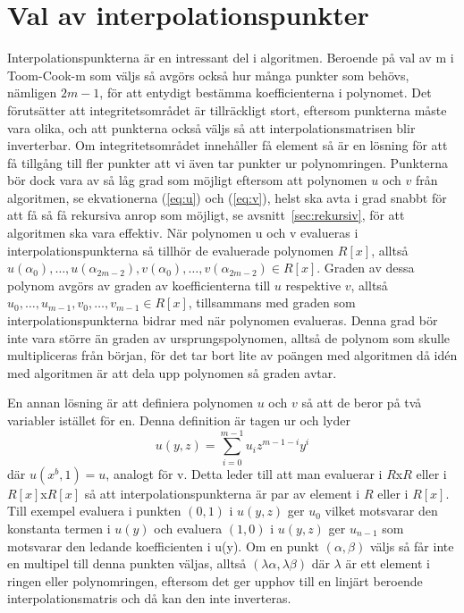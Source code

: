 \section{Val av interpolationspunkter}
Interpolationspunkterna är en intressant del i algoritmen. Beroende på val av m
i Toom-Cook-m som väljs så avgörs också hur många punkter som behövs, nämligen
$2m-1$, för att entydigt bestämma koefficienterna i polynomet. Det förutsätter
att integritetsområdet är tillräckligt stort, eftersom punkterna måste vara
olika, och att punkterna också väljs så att interpolationsmatrisen blir
inverterbar. Om integritetsområdet innehåller få element så är en lösning för
att få tillgång till fler punkter att vi även tar punkter ur polynomringen.
Punkterna bör dock vara av så låg grad som möjligt eftersom att polynomen $u$ och
$v$ från algoritmen, se ekvationerna (\ref {eq:u}) och (\ref{eq:v}), helst ska
avta i grad snabbt för att få så få rekursiva anrop som möjligt, se
avsnitt~\ref{sec:rekursiv}, för att algoritmen ska vara effektiv. När polynomen
u och v evalueras i interpolationspunkterna så tillhör de evaluerade polynomen
$R[x]$, alltså
$u(\alpha_0),\dots,u(\alpha_{2m-2}),v(\alpha_0),\dots,v(\alpha_{2m-2}) \in
R[x]$. Graden av dessa polynom avgörs av graden av koefficienterna till $u$
respektive $v$, alltså $u_0,\dots,u_{m-1},v_0,\dots,v_{m-1} \in R[x]$,
tillsammans med graden som interpolationspunkterna bidrar med när polynomen
evalueras. Denna grad bör inte vara större än graden av ursprungspolynomen,
alltså de polynom som skulle multipliceras från början, för det tar bort lite
av poängen med algoritmen då idén med algoritmen är att dela upp polynomen så
graden avtar.

En annan lösning är att definiera polynomen $u$ och $v$ så att de beror på två
variabler istället för en. Denna definition är tagen ur \cite{bodrato2007notes}
och lyder
\begin{equation*}
  u(y,z) = \sum\limits_{i=0}^{m-1} {u_iz^{m-1-i}y^i}
\end{equation*}
där $u(x^b,1) = u$, analogt för v. Detta leder till att man evaluerar i $R$x$R$
eller i $R[x]$x$R[x]$ så att interpolationspunkterna är par av element i $R$
eller i $R[x]$. Till exempel evaluera i punkten $(0,1)$ i $u(y,z)$ ger $u_0$
vilket motsvarar den konstanta termen i $u(y)$ och evaluera $(1,0)$ i $u(y,z)$
ger $u_{n-1}$ som motsvarar den ledande koefficienten i u(y). Om en punkt
$(\alpha,\beta)$ väljs så får inte en multipel till denna punkten väljas,
alltså $(\lambda\alpha,\lambda\beta)$ där $\lambda$ är ett element i ringen
eller polynomringen, eftersom det ger upphov till en linjärt beroende
interpolationsmatris och då kan den inte inverteras.

